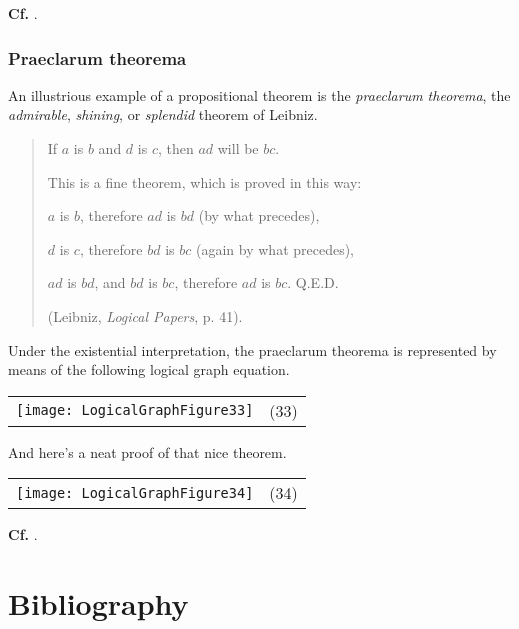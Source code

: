 \documentclass[12pt]{article}
\begin{document}
\textbf{Cf.}  .

\subsubsection{Praeclarum theorema}

An illustrious example of a propositional theorem is the \textit{praeclarum theorema}, the \textit{admirable}, \textit{shining}, or \textit{splendid} theorem of Leibniz.

\begin{quote}
If $a$ is $b$ and $d$ is $c$, then $ad$ will be $bc$.

This is a fine theorem, which is proved in this way:

$a$ is $b$, therefore $ad$ is $bd$ (by what precedes),

$d$ is $c$, therefore $bd$ is $bc$ (again by what precedes),

$ad$ is $bd$, and $bd$ is $bc$, therefore $ad$ is $bc$.  Q.E.D.

(Leibniz, \textit{Logical Papers}, p. 41).
\end{quote}

Under the existential interpretation, the praeclarum theorema is represented by means of the following logical graph equation.

\begin{center}\begin{tabular}{cc}
\texttt{[image: LogicalGraphFigure33]} & (33)
\end{tabular}\end{center}

And here's a neat proof of that nice theorem.

\begin{center}\begin{tabular}{cc}
\texttt{[image: LogicalGraphFigure34]} & (34)
\end{tabular}\end{center}

\textbf{Cf.}  .

\section{Bibliography}
\end{document}
